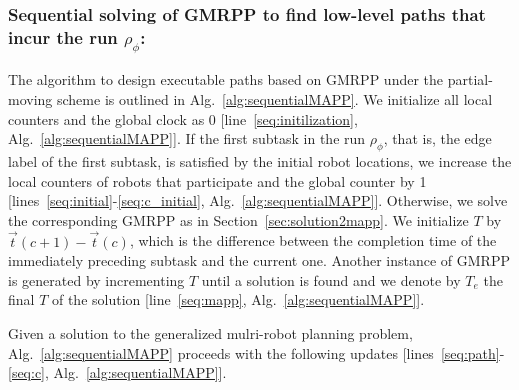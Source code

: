 \documentclass[Afour,sageh,times]{sagej}
\newcommand{\vertex}[1]{v_{\textup{#1}}}
\begin{document}
{{{\begin{algorithm}[!t]
{{{          }
        }
      }
\end{algorithm}}

 \subsubsection{Sequential solving of  GMRPP to find low-level paths that incur the run $\rho_\phi$:}
The algorithm to design executable paths based on GMRPP under the  partial-moving scheme is outlined in Alg.~\ref{alg:sequentialMAPP}.  We initialize all local counters and the global clock as 0 [line~\ref{seq:initilization}, Alg.~\ref{alg:sequentialMAPP}].
If the first subtask in the run $\rho_\phi$, that is, the edge label of the first subtask,  is satisfied by the initial  robot locations, we increase the local counters of robots that participate  and the global counter by 1 [lines~\ref{seq:initial}-\ref{seq:c_initial}, Alg.~\ref{alg:sequentialMAPP}]. Otherwise, we solve the corresponding GMRPP as in Section~\ref{sec:solution2mapp}.  We initialize $T$ by $\vec{t}(c+1) - \vec{t}(c)$,  which is the difference between the completion time of the immediately preceding subtask and the current one. Another instance of GMRPP is generated by incrementing $T$ until a solution is found and we denote by $T_e$  the final $T$ of the solution [line~\ref{seq:mapp}, Alg.~\ref{alg:sequentialMAPP}]. {Given a solution to the generalized mulri-robot planning problem, Alg.~\ref{alg:sequentialMAPP} proceeds with the following updates [lines~\ref{seq:path}-\ref{seq:c}, Alg.~\ref{alg:sequentialMAPP}].

}}}
\end{document}
